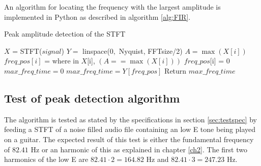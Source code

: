 An algorithm for locating the frequency with the largest amplitude is implemented in Python as described in algorithm \ref{alg:FIR}.
\begin{algorithm}[H]
\caption{Peak amplitude detection of the STFT}
\label{alg:FIR}
\begin{algorithmic}[1]
\State  $X$ = STFT($signal$) 
\State $Y =$ linspace($0,$ Nyquist, FFTsize/2) 
		\State $A = \max(X[i])$ 
		 
			\State $freq\_pos[i]$ = where in $X$[i], $(A == \max(X[i]))$ 
		\Else
			\State $freq\_pos$[i] = 0	
		\EndIf
			\State $max\_freq\_time = 0$
		\Else
			\State $max\_freq\_time = Y[freq\_pos]$
		\EndIf
	\EndFor
	\State Return $max\_freq\_time$
\EndProcedure
\end{algorithmic}
\end{algorithm}

\subsection{Test of peak detection algorithm}
The algorithm is tested as stated by the specifications in section \ref{sec:testspec} by feeding a STFT of a noise filled audio file containing an low E tone being played on a guitar.
The expected result of this test is either the fundamental frequency of $82.41$ Hz or an harmonic of this as explained in chapter \ref{ch2}. The first two harmonics of the low E are $82.41 \cdot 2 = 164.82$ Hz and $82.41 \cdot 3 = 247.23$ Hz.

